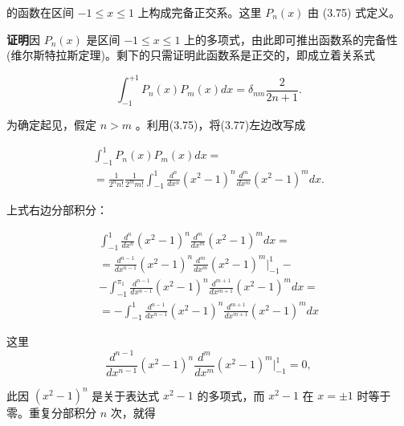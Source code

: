 的函数在区间 $-1 \leqslant x \leqslant 1$ 上构成完备正交系。这里 $P_{n}(x)$ 由 (3.75) 式定义。

\textbf{证明}\quad 因 $P_{n}(x)$ 是区间 $-1 \leqslant x \leqslant 1$ 上的多项式，由此即可推出函数系的完备性(维尔斯特拉斯定理)。剩下的只需证明此函数系是正交的，即成立着关系式

\begin{equation*}
\int_ {- 1} ^ {+ 1} P _ {n} (x) P _ {m} (x) d x = \delta_ {n m} \frac {2}{2 n + 1}.\tag{3.77}
\end{equation*}

为确定起见，假定 $n > m$ 。利用(3.75)，将(3.77)左边改写成

\begin{equation*}
\begin{array}{l} \int_ {- 1} ^ {1} P _ {n} (x) P _ {m} (x) d x = \\ = \frac {1}{2 ^ {n} n !} \frac {1}{2 ^ {m} m !} \int_ {- 1} ^ {1} \frac {d ^ {n}}{d x ^ {n}} (x ^ {2} - 1) ^ {n} \frac {d ^ {m}}{d x ^ {m}} (x ^ {2} - 1) ^ {m} d x. \end{array}\tag{3.78}
\end{equation*}

上式右边分部积分：

\begin{equation*}
\begin{array}{l} \int_ {- 1} ^ {1} \frac {d ^ {n}}{d x ^ {n}} (x ^ {2} - 1) ^ {n} \frac {d ^ {m}}{d x ^ {m}} (x ^ {2} - 1) ^ {m} d x = \\ = \frac {d ^ {n - 1}}{d x ^ {n - 1}} (x ^ {2} - 1) ^ {n} \frac {d ^ {m}}{d x ^ {m}} (x ^ {2} - 1) ^ {m} \Bigg | _ {- 1} ^ {1} - \\ - \int_ {- 1} ^ {\pi_ {1}} \frac {d ^ {n - 1}}{d x ^ {n - 1}} (x ^ {2} - 1) ^ {n} \frac {d ^ {m + 1}}{d x ^ {m + 1}} (x ^ {2} - 1) ^ {m} d x = \\ = - \int_ {- 1} ^ {1} \frac {d ^ {n - 1}}{d x ^ {n - 1}} (x ^ {2} - 1) ^ {n} \frac {d ^ {m + 1}}{d x ^ {m + 1}} (x ^ {2} - 1) ^ {m} d x \end{array}
\end{equation*}

这里
\begin{equation*}
\frac {d ^ {n - 1}}{d x ^ {n - 1}} (x ^ {2} - 1) ^ {n} \frac {d ^ {m}}{d x ^ {m}} (x ^ {2} - 1) ^ {m} \Bigg | _ {- 1} ^ {1} = 0,
\end{equation*}

此因 $(x^{2} - 1)^{n}$ 是关于表达式 $x^{2} - 1$ 的多项式，而 $x^{2} - 1$ 在 $x = \pm 1$ 时等于零。重复分部积分 $n$ 次，就得

